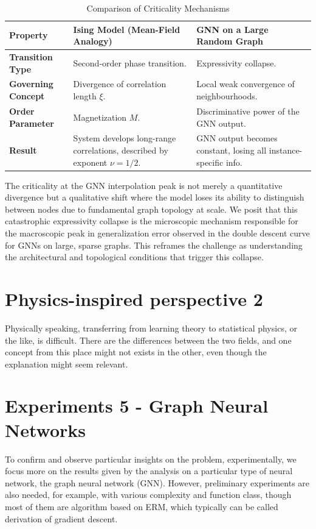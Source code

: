 \documentclass[twoside,10pt]{article}
\begin{document}
\begin{table}[h!]
\centering
\small
\caption{Comparison of Criticality Mechanisms}
\begin{tabular}{|p{3cm}|p{4cm}|p{4cm}|}
\hline
\textbf{Property} & \textbf{Ising Model (Mean-Field Analogy)} & \textbf{GNN on a Large Random Graph} \\
\hline
\textbf{Transition Type} & Second-order phase transition. & Expressivity collapse. \\
\hline
\textbf{Governing Concept} & Divergence of correlation length $\xi$. & Local weak convergence of neighbourhoods. \\
\hline
\textbf{Order Parameter} & Magnetization $M$. & Discriminative power of the GNN output. \\
\hline
\textbf{Result} & System develops long-range correlations, described by exponent $\nu=1/2$. & GNN output becomes constant, losing all instance-specific info. \\
\hline
\end{tabular}
\end{table}
The criticality at the GNN interpolation peak is not merely a quantitative divergence but a qualitative shift where the model loses its ability to distinguish between nodes due to fundamental graph topology at scale. We posit that this catastrophic expressivity collapse is the microscopic mechanism responsible for the macroscopic peak in generalization error observed in the double descent curve for GNNs on large, sparse graphs. This reframes the challenge as understanding the architectural and topological conditions that trigger this collapse.

\section{Physics-inspired perspective 2}

Physically speaking, transferring from learning theory to statistical physics, or the like, is difficult. There are the differences between the two fields, and one concept from this place might not exists in the other, even though the explanation might seem relevant. 


\clearpage

\section{Experiments 5 - Graph Neural Networks}
To confirm and observe particular insights on the problem, experimentally, we focus more on the results given by the analysis on a particular type of neural network, the graph neural network (GNN). However, preliminary experiments are also needed, for example, with various complexity and function class, though most of them are algorithm based on ERM, which typically can be called derivation of gradient descent. 
\end{document}
